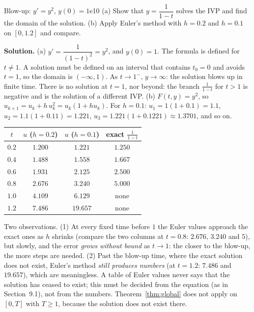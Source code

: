 \documentclass[11pt]{article}
\begin{document}
\begin{exmp}{Blow-up: $y'=y^2$, $y(0)=1$}{e10}
(a) Show that $y=\dfrac1{1-t}$ solves the IVP and find the domain of the solution. (b) Apply Euler's method with $h=0.2$ and $h=0.1$ on $[0,1.2]$ and compare.

\textbf{Solution.} (a) $y'=\dfrac1{(1-t)^2}=y^2$, and $y(0)=1$. The formula is defined for $t\ne1$. A solution must be defined on an interval that contains $t_0=0$ and avoids $t=1$, so the domain is $(-\infty,1)$. As $t\to1^-$, $y\to\infty$: the solution blows up in finite time. There is no solution at $t=1$, nor beyond: the branch $\frac1{1-t}$ for $t>1$ is negative and is the solution of a different IVP.
(b) $F(t,y)=y^2$, so $u_{k+1}=u_k+h\,u_k^2=u_k(1+hu_k)$. For $h=0.1$: $u_1=1(1+0.1)=1.1$, $u_2=1.1(1+0.11)=1.221$, $u_3=1.221(1+0.1221)\approx1.3701$, and so on.
\begin{center}
\begin{tabular}{cccc}
\toprule $t$ & $u$ ($h=0.2$) & $u$ ($h=0.1$) & exact $\frac1{1-t}$ \\\midrule
$0.2$ & $1.200$ & $1.221$ & $1.250$\\
$0.4$ & $1.488$ & $1.558$ & $1.667$\\
$0.6$ & $1.931$ & $2.125$ & $2.500$\\
$0.8$ & $2.676$ & $3.240$ & $5.000$\\
$1.0$ & $4.109$ & $6.129$ & none\\
$1.2$ & $7.486$ & $19.657$ & none\\
\bottomrule
\end{tabular}
\end{center}
Two observations. (1) At every fixed time before $1$ the Euler values approach the exact ones as $h$ shrinks (compare the two columns at $t=0.8$: $2.676$, $3.240$ and $5$), but slowly, and the error \emph{grows without bound} as $t\to1$: the closer to the blow-up, the more steps are needed. (2) Past the blow-up time, where the exact solution does not exist, Euler's method \emph{still produces numbers} (at $t=1.2$: $7.486$ and $19.657$), which are meaningless. A table of Euler values never says that the solution has ceased to exist; this must be decided from the equation (as in Section~9.1), not from the numbers. Theorem~\ref{thm:global} does not apply on $[0,T]$ with $T\ge1$, because the solution does not exist there.

\end{exmp}
\end{document}
